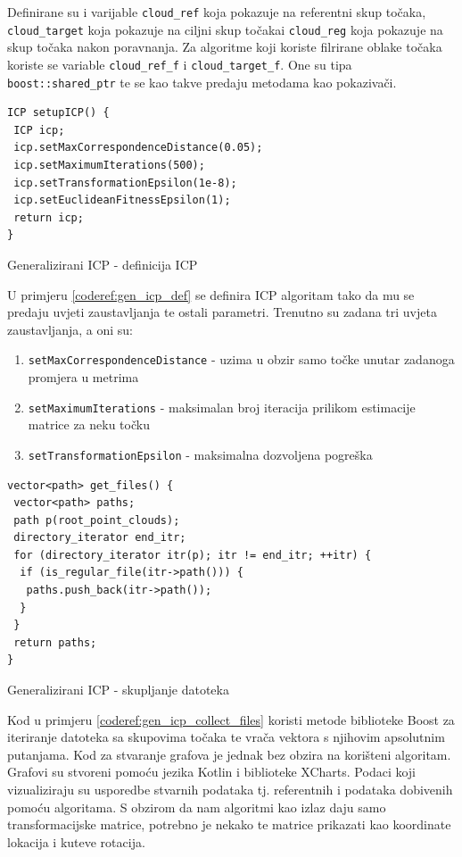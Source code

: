 Definirane su i varijable \texttt{cloud_ref} koja pokazuje na referentni skup točaka, \texttt{cloud_target} koja pokazuje na ciljni skup točakai \texttt{cloud_reg} koja pokazuje na skup točaka nakon poravnanja. Za algoritme koji koriste filrirane oblake točaka koriste se variable \texttt{cloud_ref_f} i \texttt{cloud_target_f}. One su tipa \texttt{boost::shared_ptr} te se kao takve predaju metodama kao pokazivači.

\begin{listing}[h!]
  \begin{verbatim}
ICP setupICP() {
 ICP icp;
 icp.setMaxCorrespondenceDistance(0.05);
 icp.setMaximumIterations(500);
 icp.setTransformationEpsilon(1e-8);
 icp.setEuclideanFitnessEpsilon(1);
 return icp;
}
  \end{verbatim}
  \caption{Generalizirani ICP - definicija ICP}
  \label{coderef:gen_icp_def}
\end{listing}
\pagebreak
U primjeru \ref{coderef:gen_icp_def} se definira ICP algoritam tako da mu se predaju uvjeti zaustavljanja te ostali parametri. Trenutno su zadana tri uvjeta zaustavljanja, a oni su:

\begin{enumerate}
  \item \texttt{setMaxCorrespondenceDistance} - uzima u obzir samo točke unutar zadanoga promjera u metrima
  \item \texttt{setMaximumIterations} - maksimalan broj iteracija prilikom estimacije matrice za neku točku
  \item \texttt{setTransformationEpsilon} - maksimalna dozvoljena pogreška
\end{enumerate}

\begin{listing}[h!]
  \begin{verbatim}
vector<path> get_files() {
 vector<path> paths;
 path p(root_point_clouds);
 directory_iterator end_itr;
 for (directory_iterator itr(p); itr != end_itr; ++itr) {
  if (is_regular_file(itr->path())) {
   paths.push_back(itr->path());
  }
 }
 return paths;
}
  \end{verbatim}
  \caption{Generalizirani ICP - skupljanje datoteka}
  \label{coderef:gen_icp_collect_files}
\end{listing}
\pagebreak
Kod u primjeru \ref{coderef:gen_icp_collect_files} koristi metode biblioteke Boost za iteriranje datoteka sa skupovima točaka te vrača vektora s njihovim apsolutnim putanjama. Kod za stvaranje grafova je jednak bez obzira na korišteni algoritam. Grafovi su stvoreni pomoću jezika Kotlin i biblioteke XCharts. Podaci koji vizualiziraju su usporedbe stvarnih podataka tj. referentnih i podataka dobivenih pomoću algoritama. S obzirom da nam algoritmi kao izlaz daju samo transformacijske matrice, potrebno je nekako te matrice prikazati kao koordinate lokacija i kuteve rotacija.

